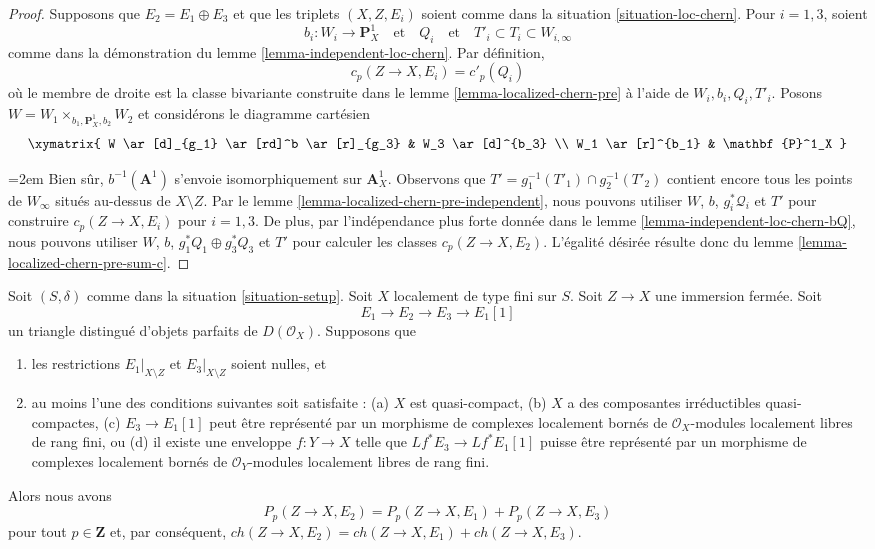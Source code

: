 \begin{proof}
\medskip\noindent
Supposons que $E_2 = E_1 \oplus E_3$ et que les triplets $(X, Z, E_i)$
soient comme dans la situation \ref{situation-loc-chern}.
Pour $i = 1, 3$, soient
$$
b_i : W_i \to \mathbf{P}^1_X
\quad\text{et}\quad
Q_i
\quad\text{et}\quad
T'_i \subset T_i \subset W_{i, \infty}
$$
comme dans la démonstration du lemme \ref{lemma-independent-loc-chern}.
Par définition,
$$
c_p(Z \to X, E_i) = c'_p(Q_i)
$$
où le membre de droite est la classe bivariante construite dans le
lemme \ref{lemma-localized-chern-pre} à l'aide de $W_i, b_i, Q_i, T'_i$.
Posons $W = W_1 \times_{b_1, \mathbf{P}^1_X, b_2} W_2$ et considérons
le diagramme cartésien
$$
\xymatrix{
W \ar[d]_{g_1} \ar[rd]^b \ar[r]_{g_3} & W_3 \ar[d]^{b_3} \\
W_1 \ar[r]^{b_1} & \mathbf{P}^1_X
}
$$
{\emergencystretch=2em Bien sûr, $b^{-1}(\mathbf{A}^1)$ s'envoie isomorphiquement sur $\mathbf{A}^1_X$.
Observons que $T' = g_1^{-1}(T'_1) \cap g_2^{-1}(T'_2)$ contient encore
tous les points de $W_\infty$ situés au-dessus de $X \setminus Z$.
Par le lemme \ref{lemma-localized-chern-pre-independent}, nous pouvons utiliser
$W$, $b$, $g_i^*\mathcal{Q}_i$ et
$T'$ pour construire $c_p(Z \to X, E_i)$ pour $i = 1, 3$.
De plus, par l'indépendance plus forte donnée dans le
lemme \ref{lemma-independent-loc-chern-bQ}, nous pouvons utiliser
$W$, $b$, $g_1^*Q_1 \oplus g_3^*Q_3$ et $T'$
pour calculer les classes $c_p(Z \to X, E_2)$.
L'égalité désirée résulte donc du
lemme \ref{lemma-localized-chern-pre-sum-c}.\par}
\end{proof}

\begin{lemma}
\label{lemma-additivity-loc-chern-P}
Soit $(S, \delta)$ comme dans la situation \ref{situation-setup}.
Soit $X$ localement de type fini sur $S$. Soit $Z \to X$
une immersion fermée. Soit
$$
E_1 \to E_2 \to E_3 \to E_1[1]
$$
un triangle distingué d'objets parfaits de $D(\mathcal{O}_X)$.
Supposons que
\begin{enumerate}
\item les restrictions $E_1|_{X \setminus Z}$ et $E_3|_{X \setminus Z}$
soient nulles, et
\item au moins l'une des conditions suivantes soit satisfaite :
(a) $X$ est quasi-compact,
(b) $X$ a des composantes irréductibles quasi-compactes,
(c) $E_3 \to E_1[1]$ peut être représenté par un morphisme de complexes
localement bornés de $\mathcal{O}_X$-modules localement libres de rang fini, ou
(d) il existe une enveloppe $f : Y \to X$ telle que $Lf^*E_3 \to Lf^*E_1[1]$
puisse être représenté par un morphisme de complexes localement bornés de
$\mathcal{O}_Y$-modules localement libres de rang fini.
\end{enumerate}
Alors nous avons
$$
P_p(Z \to X, E_2) = P_p(Z \to X, E_1) + P_p(Z \to X, E_3)
$$
pour tout $p \in \mathbf{Z}$ et, par conséquent,
$ch(Z \to X, E_2) = ch(Z \to X, E_1) + ch(Z \to X, E_3)$.
\end{lemma}


